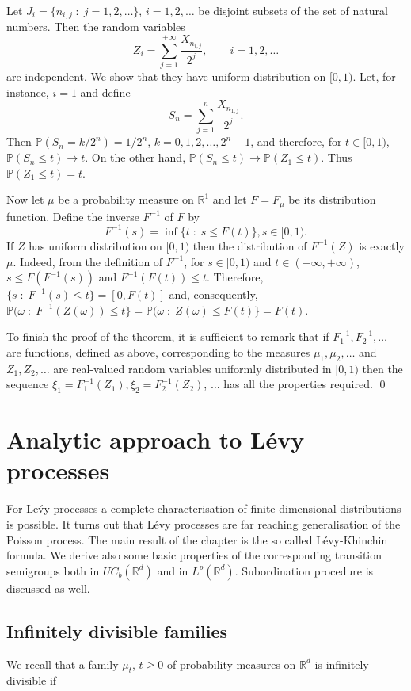 \documentclass[preprint]{imsart}
\def\P{\mathbb P}
\def\R{\mathbb R}
\begin{document}
{Let $J_i=\{n_{i,j}\; : \; j=1,2,\ldots\}$,
$i=1,2,\ldots$ be disjoint subsets of the set of natural numbers.
Then the random variables
$$
Z_i=\sum_{j=1}^{+\infty} \frac{X_{n_{i,j}}}{2^j},
\qquad i=1,2,\ldots
$$
are independent. We show that they have uniform distribution on
$[0,1)$. Let, for instance, $i=1$ and define
$$
S_n=\sum_{j=1}^{n} \frac{X_{n_{1,j}}}{2^j}.
$$
Then $\P(S_n=k/2^n)= 1/2^n$, $k=0,1,2,\ldots, 2^n-1$, and
therefore, for $t\in [0,1)$, $\P(S_n\leq t)\to t$. On the other
hand, $\P(S_n\leq t)\to \P(Z_1\leq t)$. Thus $\P(Z_1\leq t)=t.$

Now let $\mu$ be a probability measure on $\R^1$ and let $F=F_\mu$
be its distribution function. Define the inverse $F^{-1}$ of $F$ by
$$
F^{-1}(s)=\inf \{ t\; :\; s\leq
F(t)\}, s\in [0,1).
$$
If $Z$  has uniform distribution on $[0,1)$
then the distribution of $F^{-1}(Z)$ is exactly $\mu$. Indeed, from
the definition of $F^{-1}$, for $s\in [0,1)$ and $t\in
(-\infty,+\infty)$, $s\leq F(F^{-1}(s))$ and $F^{-1}(F(t))\leq t$.
Therefore, $\{s\; :\; F^{-1}(s)\leq t\}=[0,F(t)]$ and, consequently,
$\P(\omega\; :\;F^{-1}(Z(\omega))\leq t\}=
\P(\omega\; :\;Z(\omega)\leq F(t)\}= F(t)$.

To finish  the proof of the theorem, it is sufficient to remark
that if $F^{-1}_1, F^{-1}_2,\ldots$ are functions, defined as above,
corresponding to the measures  $\mu_1, \mu_2,\ldots$  and
$Z_1, Z_2,\ldots$ are real-valued random variables uniformly
distributed in $[0,1)$ then the sequence
$\xi_1 = F^{-1}_1(Z_1), \xi_{2} = F^{-1}_2(Z_2)$, $\ldots$ has all the properties required.
\qed


\chapter{Analytic approach to  L\'evy processes}
For  Le\'vy processes
 a complete characterisation of finite dimensional
distributions is possible. It turns out that L\'evy processes are far  reaching generalisation
of the Poisson process. The main result of the chapter is the so called
L\'evy-Khinchin formula. We
derive also some basic properties of the corresponding transition semigroups both in $UC_b(\R^d)$ and in $L^{p}(\R^d)$.
Subordination procedure is discussed as well.
\section{Infinitely divisible families}
We recall  that a family $\mu_t$, $t\geq 0$ of probability measures on $\R^d$ is
infinitely divisible if

}
\end{document}
